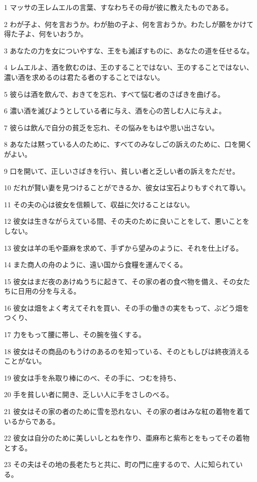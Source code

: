 \par 1 マッサの王レムエルの言葉、すなわちその母が彼に教えたものである。
\par 2 わが子よ、何を言おうか。わが胎の子よ、何を言おうか。わたしが願をかけて得た子よ、何をいおうか。
\par 3 あなたの力を女についやすな、王をも滅ぼすものに、あなたの道を任せるな。
\par 4 レムエルよ、酒を飲むのは、王のすることではない、王のすることではない、濃い酒を求めるのは君たる者のすることではない。
\par 5 彼らは酒を飲んで、おきてを忘れ、すべて悩む者のさばきを曲げる。
\par 6 濃い酒を滅びようとしている者に与え、酒を心の苦しむ人に与えよ。
\par 7 彼らは飲んで自分の貧乏を忘れ、その悩みをもはや思い出さない。
\par 8 あなたは黙っている人のために、すべてのみなしごの訴えのために、口を開くがよい。
\par 9 口を開いて、正しいさばきを行い、貧しい者と乏しい者の訴えをただせ。
\par 10 だれが賢い妻を見つけることができるか、彼女は宝石よりもすぐれて尊い。
\par 11 その夫の心は彼女を信頼して、収益に欠けることはない。
\par 12 彼女は生きながらえている間、その夫のために良いことをして、悪いことをしない。
\par 13 彼女は羊の毛や亜麻を求めて、手ずから望みのように、それを仕上げる。
\par 14 また商人の舟のように、遠い国から食糧を運んでくる。
\par 15 彼女はまだ夜のあけぬうちに起きて、その家の者の食べ物を備え、その女たちに日用の分を与える。
\par 16 彼女は畑をよく考えてそれを買い、その手の働きの実をもって、ぶどう畑をつくり、
\par 17 力をもって腰に帯し、その腕を強くする。
\par 18 彼女はその商品のもうけのあるのを知っている、そのともしびは終夜消えることがない。
\par 19 彼女は手を糸取り棒にのべ、その手に、つむを持ち、
\par 20 手を貧しい者に開き、乏しい人に手をさしのべる。
\par 21 彼女はその家の者のために雪を恐れない、その家の者はみな紅の着物を着ているからである。
\par 22 彼女は自分のために美しいしとねを作り、亜麻布と紫布とをもってその着物とする。
\par 23 その夫はその地の長老たちと共に、町の門に座するので、人に知られている。
